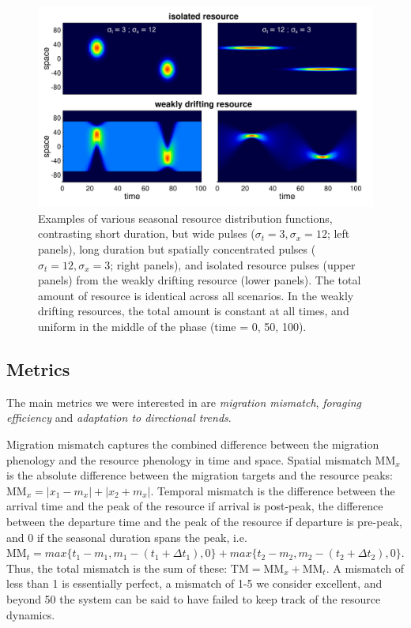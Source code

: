 \documentclass[utf8]{frontiersSCNS} %
\begin{document}
	\begin{figure}[t!]
		\includegraphics[width = \textwidth]{figures/ResourceExamples.png}
		
		\caption{\label{fig_ResourceExamples}  Examples of various seasonal resource distribution functions, contrasting short duration, but wide pulses ($\sigma_t = 3, \sigma_x = 12$; left panels), long duration but spatially concentrated pulses ($\sigma_t = 12, \sigma_x = 3$; right panels), and isolated resource pulses (upper panels) from the weakly drifting resource (lower panels). The total amount of resource is identical across all scenarios. In the weakly drifting resources, the total amount is constant at all times, and uniform in the middle of the phase (time = 0, 50, 100).}
	\end{figure}
	
\subsection{Metrics}
	
	The main metrics we were interested in are \emph{migration mismatch}, \emph{foraging efficiency} and \emph{adaptation to directional trends}.
	
	Migration mismatch captures the combined difference between the migration phenology and the resource phenology in time and space. Spatial mismatch $\text{MM}_x$ is the absolute difference between the migration targets and the resource peaks: $\text{MM}_x = |x_1 - m_x| + |x_2 + m_x|$. Temporal mismatch is the difference between the arrival time and the peak of the resource if arrival is post-peak, the difference between the departure time and the peak of the resource if departure is pre-peak, and 0 if the seasonal duration spans the peak, i.e.~$\text{MM}_t = max\{t_1 - m_1, m_1 - (t_1 + \Delta t_1), 0\} + max\{t_2 - m_2, m_2 - (t_2 + \Delta t_2), 0\}$. Thus, the total mismatch is the sum of these: $\text{TM} = \text{MM}_x + \text{MM}_t$. A mismatch of less than 1 is essentially perfect, a mismatch of 1-5 we consider excellent, and beyond 50 the system can be said to have failed to keep track of the resource dynamics.
	
\end{document}
